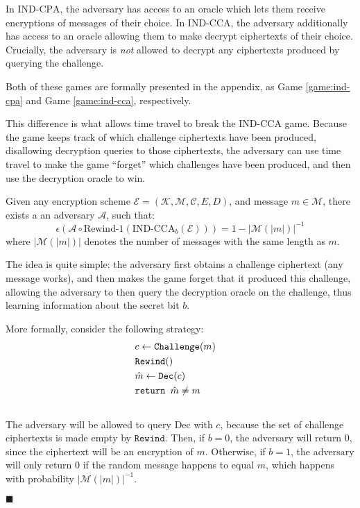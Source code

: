 In $\text{IND-CPA}$, the adversary has access to an oracle which lets them
receive encryptions of messages of their choice.
In $\text{IND-CCA}$, the adversary additionally has access to an oracle
allowing them to make decrypt ciphertexts of their choice.
Crucially, the adversary is \emph{not} allowed to decrypt any ciphertexts
produced by querying the challenge.

Both of these games are formally presented in the appendix, as
Game \ref{game:ind-cpa} and Game \ref{game:ind-cca}, respectively.

This difference is what allows time travel to break the
$\text{IND-CCA}$ game.
Because the game keeps track of which challenge ciphertexts have been produced,
disallowing decryption queries to those ciphertexts, the adversary
can use time travel to make the game ``forget'' which challenges have
been produced, and then use the decryption oracle to win.

\begin{claim}
\label{claim:ind-cca-broken}
Given any encryption scheme $\mathcal{E} = (\mathcal{K}, \mathcal{M}, \mathcal{C}, E, D)$, and message $m \in \mathcal{M}$, there exists a an adversary
$\mathcal{A}$, such that:
$$
\epsilon(\mathcal{A} \circ \text{Rewind-1}(\text{IND-CCA}_b(\mathcal{E}))) = 1 - |\mathcal{M}(|m|)|^{-1}
$$
where $|\mathcal{M}(|m|)|$ denotes the number of messages with the same length as $m$.
\end{claim}

The idea is quite simple: the adversary first obtains a challenge ciphertext (any message works),
and then makes the game forget that it produced this challenge, allowing the adversary
to then query the decryption oracle on the challenge, thus learning
information about the secret bit $b$.

More formally, consider the following strategy:
$$
\begin{aligned}
&c \gets \texttt{Challenge}(m)\cr
&\texttt{Rewind}()\cr
&\hat{m} \gets \texttt{Dec}(c)\cr
&\texttt{return } \hat{m} \neq m\cr
&
\end{aligned}
$$
The adversary will be allowed to query $\text{Dec}$ with $c$,
because the set of challenge ciphertexts is made empty by $\texttt{Rewind}$.
Then, if $b = 0$, the adversary will return $0$, since the ciphertext
will be an encryption of $m$.
Otherwise, if $b = 1$, the adversary will only return $0$ if the
random message happens to equal $m$, which happens with probability
$|\mathcal{M}(|m|)|^{-1}$.

$\blacksquare$

